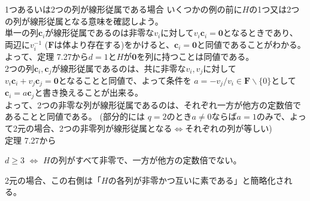 \documentclass[dvipdfmx,10pt,jsarticle]{beamer}
\newcommand{\F}{\mathbf{F}}
\newcommand{\sets}[1]{\lbrace{}  #1 \rbrace}
\renewcommand{\vec}[1]{\mathbf{#1}}
\begin{document}
  \begin{frame}{1つあるいは2つの列が線形従属である場合}
    いくつかの例の前に$H$の1つ又は2つの列が線形従属となる意味を確認しよう。 \\
    \vspace{1em}
    単一の列$\vec{c}_i$が線形従属であるのは非零な$v_i$に対して$v_i \vec{c}_i = \vec{0}$となるときであり、 \\
    両辺に$v_i^{-1}$ ($\F$は体より存在する)をかけると、$\vec{c}_i = \vec{0}$と同値であることがわかる。 \\
    よって、定理 7.27から$d=1$と$H$が$\vec{0}$を列に持つことは同値である。 \\
    \vspace{1em}
    2つの列$\vec{c}_i, \vec{c}_j$が線形従属であるのは、共に非零な$v_i, v_j$に対して \\
    $v_i \vec{c}_i + v_j \vec{c}_j = \vec{0}$となることと同値で、よって条件を
    $a = - v_j / v_i \in \F \backslash \sets{0}$として$\vec{c}_i = a \vec{c}_j$と書き換えることが出来る。 \\
    よって、2つの非零な列が線形従属であるのは、それぞれ一方が他方の定数倍であることと同値である。 
    (部分的には $q=2$のとき$a \neq 0$ならば$a = 1$のみで、よって2元の場合、2つの非零列が線形従属となる$\Leftrightarrow$それぞれの列が等しい)\\
    \vspace{1em}
    定理 7.27から \\
    \begin{center}
      $d \geq 3$ $\Leftrightarrow$ $H$の列がすべて非零で、一方が他方の定数倍でない。 \\
    \end{center}
  2元の場合、この右側は「$H$の各列が非零かつ互いに素である」と簡略化される。
  \end{frame}
\end{document}
